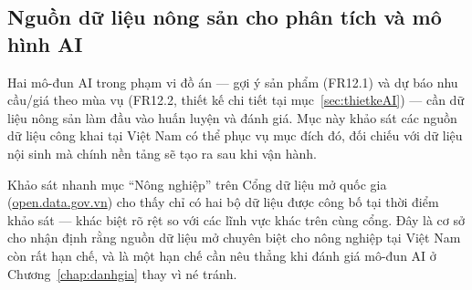 
\subsection*{Nguồn dữ liệu nông sản cho phân tích và mô hình AI}
\label{subsec:nguondulieunongsan}

Hai mô-đun AI trong phạm vi đồ án --- gợi ý sản phẩm (FR12.1) và dự báo nhu cầu/giá theo mùa vụ (FR12.2, thiết kế chi tiết tại mục~\ref{sec:thietkeAI}) --- cần dữ liệu nông sản làm đầu vào huấn luyện và đánh giá. Mục này khảo sát các nguồn dữ liệu công khai tại Việt Nam có thể phục vụ mục đích đó, đối chiếu với dữ liệu nội sinh mà chính nền tảng sẽ tạo ra sau khi vận hành.

Khảo sát nhanh mục ``Nông nghiệp'' trên Cổng dữ liệu mở quốc gia (\url{open.data.gov.vn}) cho thấy chỉ có hai bộ dữ liệu được công bố tại thời điểm khảo sát --- khác biệt rõ rệt so với các lĩnh vực khác trên cùng cổng. Đây là cơ sở cho nhận định rằng nguồn dữ liệu mở chuyên biệt cho nông nghiệp tại Việt Nam còn rất hạn chế, và là một hạn chế cần nêu thẳng khi đánh giá mô-đun AI ở Chương~\ref{chap:danhgia} thay vì né tránh.

